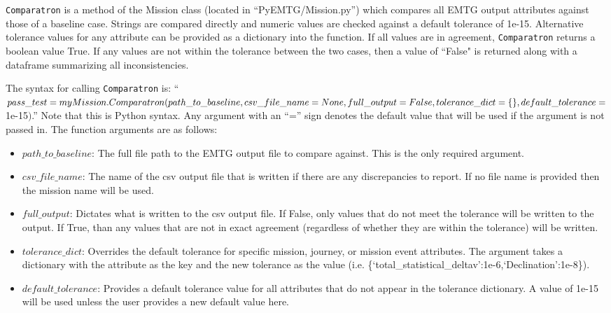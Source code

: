 \texttt{Comparatron} is a method of the Mission class (located in ``PyEMTG/Mission.py'') which compares all \ac{EMTG} output attributes against those of a baseline case. Strings are compared directly and numeric values are checked against a default tolerance of 1e-15. Alternative tolerance values for any attribute can be provided as a dictionary into the function. If all values are in agreement, \texttt{Comparatron} returns a boolean value True. If any values are not within the tolerance between the two cases, then a value of ``False" is returned along with a dataframe summarizing all inconsistencies.

The syntax for calling \texttt{Comparatron} is: ``$pass\_test=myMission.Comparatron(path\_to\_baseline,\linebreak csv\_file\_name=None,full\_output=False,tolerance\_dict=\{\},default\_tolerance=$1e-15$)$.'' Note that this is Python syntax. Any argument with an ``='' sign denotes the default value that will be used if the argument is not passed in. The function arguments are as follows:
\begin{itemize}[label=$\bullet$]
	\item $path\_to\_baseline$: The full file path to the \ac{EMTG} output file to compare against. This is the only required argument.
	\item $csv\_file\_name$: The name of the csv output file that is written if there are any discrepancies to report. If no file name is provided then the mission name will be used.
	\item $full\_output$: Dictates what is written to the csv output file. If False, only values that do not meet the tolerance will be written to the output. If True, than any values that are not in exact agreement (regardless of whether they are within the tolerance) will be written. 
	\item $tolerance\_dict$: Overrides the default tolerance for specific mission, journey, or mission event attributes. The argument takes a dictionary with the attribute as the key and the new tolerance as the value (i.e. \{`total\_statistical\_deltav':1e-6,`Declination':1e-8\}).
	\item $default\_tolerance$: Provides a default tolerance value for all attributes that do not appear in the tolerance dictionary. A value of 1e-15 will be used unless the user provides a new default value here.
\end{itemize}

